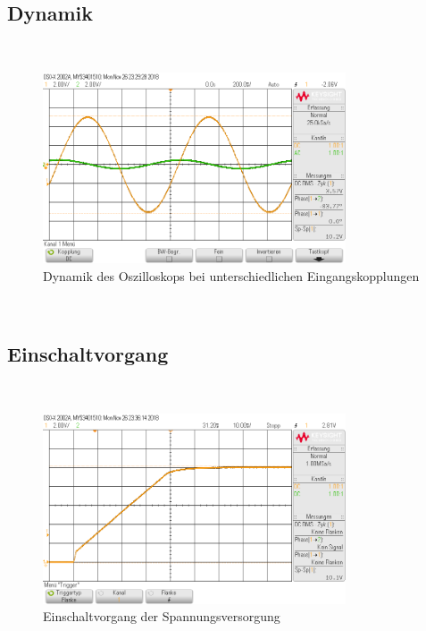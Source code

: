 \subsection{Dynamik}
~\\
\begin{figure}[h]
  \centering
  \includegraphics[width=0.8\textwidth]{./img/ch1/dynamik}
  \caption{Dynamik des Oszilloskops bei unterschiedlichen Eingangskopplungen}  
\end{figure} 
~\\

\subsection{Einschaltvorgang}
~\\
\begin{figure}[h]
  \centering
  \includegraphics[width=0.8\textwidth]{./img/ch1/einschaltvorgang}
  \caption{Einschaltvorgang der Spannungsversorgung}  
\end{figure} 
~\\


